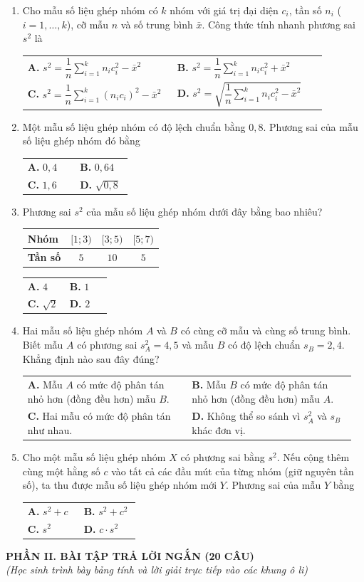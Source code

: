 \documentclass[12pt,a4paper]{article}
\makeatletter
\newcommand{\bonpa}[4]{\par\nobreak\smallskip\nobreak\noindent
\begin{tabular}{@{}p{0.48\linewidth}p{0.48\linewidth}@{}}
\textbf{A.} #1 & \textbf{B.} #2\\[7pt]
\textbf{C.} #3 & \textbf{D.} #4\end{tabular}}
\makeatother
\begin{document}
\begin{enumerate}
\item Cho mẫu số liệu ghép nhóm có $k$ nhóm với giá trị đại diện $c_i$, tần số $n_i$ ($i = 1, \dots, k$), cỡ mẫu $n$ và số trung bình $\bar{x}$. Công thức tính nhanh phương sai $s^2$ là
\bonpa{$s^2 = \dfrac{1}{n}\sum\limits_{i=1}^k n_i c_i^2 - \bar{x}^2$}{$s^2 = \dfrac{1}{n}\sum\limits_{i=1}^k n_i c_i^2 + \bar{x}^2$}{$s^2 = \dfrac{1}{n}\sum\limits_{i=1}^k (n_i c_i)^2 - \bar{x}^2$}{$s^2 = \sqrt{\dfrac{1}{n}\sum\limits_{i=1}^k n_i c_i^2 - \bar{x}^2}$}

\item Một mẫu số liệu ghép nhóm có độ lệch chuẩn bằng $0{,}8$. Phương sai của mẫu số liệu ghép nhóm đó bằng
\bonpa{$0{,}4$}{$0{,}64$}{$1{,}6$}{$\sqrt{0{,}8}$}

\item Phương sai $s^2$ của mẫu số liệu ghép nhóm dưới đây bằng bao nhiêu?
\begin{center}
\begin{tabular}{|l|c|c|c|}
\hline
\textbf{Nhóm} & $[1; 3)$ & $[3; 5)$ & $[5; 7)$ \\ \hline
\textbf{Tần số} & $5$ & $10$ & $5$ \\ \hline
\end{tabular}
\end{center}
\bonpa{$4$}{$1$}{$\sqrt{2}$}{$2$}

\item Hai mẫu số liệu ghép nhóm $A$ và $B$ có cùng cỡ mẫu và cùng số trung bình. Biết mẫu $A$ có phương sai $s_A^2 = 4{,}5$ và mẫu $B$ có độ lệch chuẩn $s_B = 2{,}4$. Khẳng định nào sau đây đúng?
\bonpa{Mẫu $A$ có mức độ phân tán nhỏ hơn (đồng đều hơn) mẫu $B$.}{Mẫu $B$ có mức độ phân tán nhỏ hơn (đồng đều hơn) mẫu $A$.}{Hai mẫu có mức độ phân tán như nhau.}{Không thể so sánh vì $s_A^2$ và $s_B$ khác đơn vị.}

\item Cho một mẫu số liệu ghép nhóm $X$ có phương sai bằng $s^2$. Nếu cộng thêm cùng một hằng số $c$ vào tất cả các đầu mút của từng nhóm (giữ nguyên tần số), ta thu được mẫu số liệu ghép nhóm mới $Y$. Phương sai của mẫu $Y$ bằng
\bonpa{$s^2 + c$}{$s^2 + c^2$}{$s^2$}{$c \cdot s^2$}
\end{enumerate}

\newpage
\begin{center}
    {\fontsize{13}{15}\selectfont\textbf{PHẦN II. BÀI TẬP TRẢ LỜI NGẮN (20 CÂU)}} \\[2pt]
    {\small\textit{(Học sinh trình bày bảng tính và lời giải trực tiếp vào các khung ô li)}}
\end{center}
\end{document}
